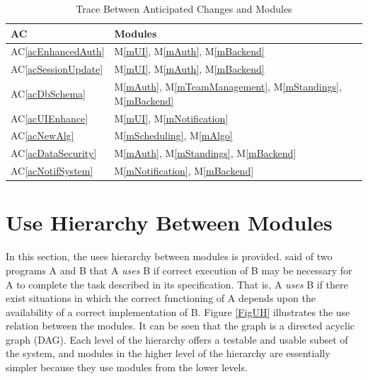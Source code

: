 \documentclass[12pt, titlepage]{article}
\newcommand{\acref}[1]{AC\ref{#1}}
\newcommand{\mref}[1]{M\ref{#1}}
\begin{document}
\begin{table}[H]
\centering
\begin{tabular}{p{} p{}}
\toprule
\textbf{AC} & \textbf{Modules}\\
\midrule
\acref{acEnhancedAuth} & \mref{mUI}, \mref{mAuth}, \mref{mBackend}\\
\acref{acSessionUpdate} & \mref{mUI}, \mref{mAuth}, \mref{mBackend}\\
\acref{acDbSchema} & \mref{mAuth}, \mref{mTeamManagement}, \mref{mStandings}, \mref{mBackend}\\
\acref{acUIEnhance} & \mref{mUI}, \mref{mNotification}\\
\acref{acNewAlg} & \mref{mScheduling}, \mref{mAlgo}\\
\acref{acDataSecurity} & \mref{mAuth}, \mref{mStandings}, \mref{mBackend}\\
\acref{acNotifSystem} & \mref{mNotification}, \mref{mBackend}\\
\bottomrule
\end{tabular}
\caption{Trace Between Anticipated Changes and Modules}
\label{TblACT}
\end{table}

\section{Use Hierarchy Between Modules} \label{SecUse}

In this section, the uses hierarchy between modules is
provided. \citet{Parnas1978} said of two programs A and B that A {\em uses} B if
correct execution of B may be necessary for A to complete the task described in
its specification. That is, A {\em uses} B if there exist situations in which
the correct functioning of A depends upon the availability of a correct
implementation of B.  Figure \ref{FigUH} illustrates the use relation between
the modules. It can be seen that the graph is a directed acyclic graph
(DAG). Each level of the hierarchy offers a testable and usable subset of the
system, and modules in the higher level of the hierarchy are essentially simpler
because they use modules from the lower levels.
\end{document}
